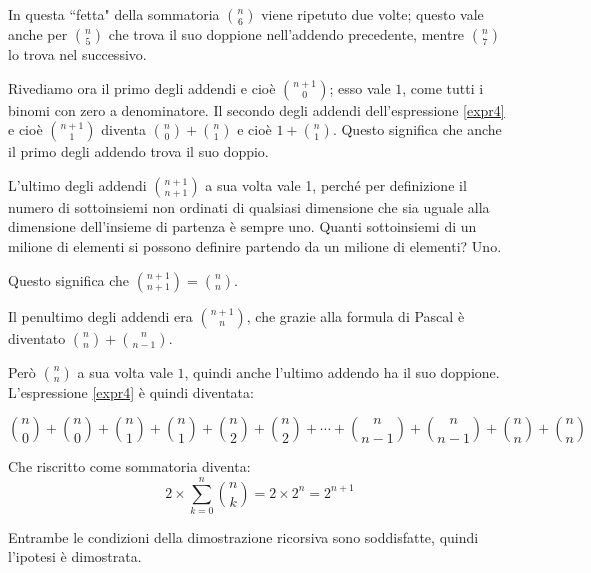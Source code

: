 In questa ``fetta" della sommatoria ${n\choose 6}$ viene ripetuto due volte; questo vale anche per ${n\choose 5}$ che trova il suo doppione nell'addendo precedente, mentre ${n \choose 7}$ lo trova nel successivo.

Rivediamo ora il primo degli addendi e cioè ${n+1 \choose 0}$; esso vale $1$, come tutti i binomi con zero a denominatore.
Il secondo degli addendi dell'espressione \ref{expr4} e cioè ${n+1\choose 1}$ diventa ${n\choose 0}+{n\choose 1}$ e cioè $1+{n\choose 1}$.  Questo significa che anche il primo degli addendo trova il suo doppio.

L'ultimo degli addendi ${n+1\choose n+1}$ a sua volta vale 1, perché per definizione il numero di sottoinsiemi non ordinati di qualsiasi dimensione che sia uguale alla dimensione dell'insieme di partenza è sempre uno.  Quanti sottoinsiemi di un milione di elementi si possono definire partendo da un milione di elementi?  Uno.

Questo significa che ${n+1\choose n+1}={n\choose n}$.

Il penultimo degli addendi era ${n+1\choose n}$, che grazie alla formula di Pascal è diventato ${n\choose n}+{n\choose n-1}$.

Però ${n\choose n}$ a sua volta vale $1$, quindi anche l'ultimo addendo ha il suo doppione.  L'espressione \ref{expr4} è quindi diventata:

\begin{equation*}
{n\choose 0}+{n\choose 0}+
{n\choose 1}+{n\choose 1}+
{n\choose 2}+{n\choose 2}+\cdots+
{n\choose n-1}+{n\choose n-1}+
{n\choose n}+{n\choose n}
\end{equation*}

Che riscritto come sommatoria diventa:
\begin{equation*}
2\times\sum_{k=0}^n{{n\choose k}} = 2\times2^n=2^{n+1}
\end{equation*}

Entrambe le condizioni della dimostrazione ricorsiva sono soddisfatte, quindi l'ipotesi è dimostrata.
